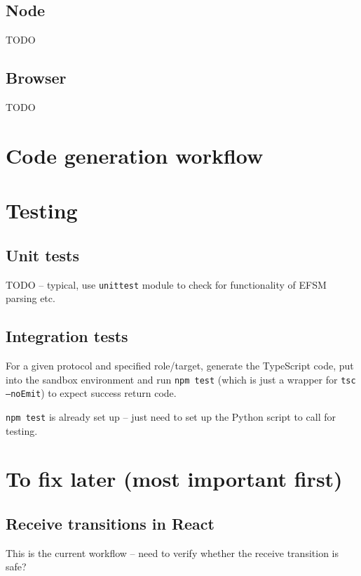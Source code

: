 \documentclass{article}
\begin{document}
\subsection{Node}

TODO

\subsection{Browser}

TODO

\section{Code generation workflow}

\section{Testing}

\subsection{Unit tests}
TODO -- typical, use \texttt{unittest} module
to check for functionality of EFSM parsing
etc.

\subsection{Integration tests}
For a given protocol and specified role/target,
generate the TypeScript code, put into the
sandbox environment and run \texttt{npm test} 
(which is just a wrapper for 
\texttt{tsc --noEmit})
to expect success return code.

\texttt{npm test} is already set up -- just need to
set up the Python script to call for testing.

\section{To fix later (most important first)}

\subsection*{Receive transitions in React}
This is the current workflow -- need to verify whether the receive transition is safe?
\end{document}

